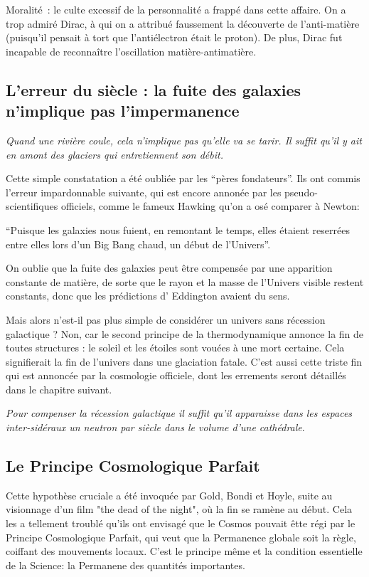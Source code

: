 \documentclass[a4paper,12pt]{article}
\begin{document}
Moralité : le culte excessif de la personnalité a frappé dans cette affaire. On a trop admiré Dirac, à qui on a attribué faussement la découverte de l’anti-matière (puisqu’il pensait à tort que l’antiélectron était le proton). De plus, Dirac fut incapable de reconnaître l'oscillation matière-antimatière.


\subsection{L'erreur du siècle : la fuite des galaxies n'implique pas l'impermanence}

    \textit{ Quand une rivière coule, cela n'implique pas qu'elle va se tarir. Il suffit qu'il y ait en amont des glaciers qui entretiennent son débit.}
     

Cette simple constatation a été oubliée par les ``pères fondateurs''. Ils ont commis l'erreur impardonnable suivante, qui est encore annonée par les pseudo-scientifiques officiels, comme le fameux Hawking qu'on a osé comparer à Newton:

``Puisque les galaxies nous fuient, en remontant le temps, elles étaient reserrées entre elles lors d'un Big Bang chaud, un début de l'Univers''.

On oublie que la fuite des galaxies peut être compensée par une apparition constante de matière, de sorte que le rayon et la masse de l'Univers visible restent constants, donc que les prédictions d' Eddington avaient du sens.

Mais alors n'est-il pas plus simple de considérer un univers sans récession galactique ? Non, car le second principe de la thermodynamique annonce la fin de toutes structures : le soleil et les étoiles sont vouées à une mort certaine. Cela signifierait la fin de l'univers dans une glaciation fatale.  C'est aussi cette triste fin qui est annoncée par la cosmologie officiele, dont les errements seront détaillés dans le chapitre suivant.

\textit{Pour compenser la récession galactique il suffit qu'il apparaisse dans les espaces inter-sidéraux un neutron par siècle dans le volume d'une cathédrale}.

\subsection{Le Principe Cosmologique Parfait}

Cette hypothèse cruciale a été invoquée par Gold, Bondi et Hoyle, suite au visionnage d'un film "the dead of the night", où la fin se ramène au début. Cela les a tellement troublé qu'ils ont envisagé que le Cosmos pouvait êtte régi par le  Principe Cosmologique Parfait, qui veut que la Permanence globale soit la règle, coiffant des mouvements locaux. C'est le principe même et la condition essentielle de la Science: la Permanene des quantités importantes.
\end{document}
